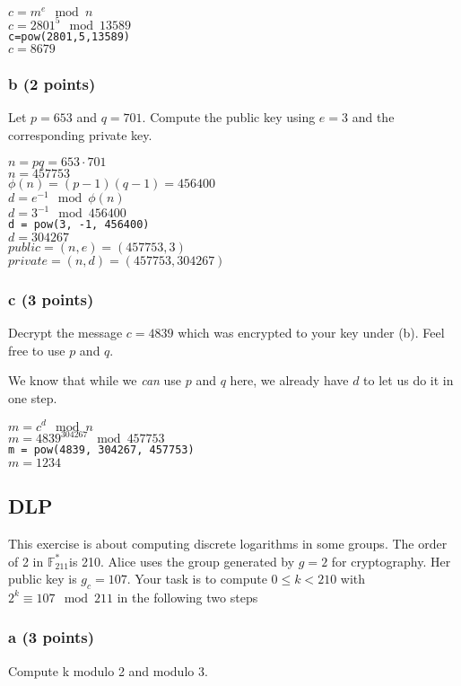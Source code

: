 \documentclass{article}
\begin{document}
$c=m^e \mod n$ \\
$c=2801^5 \mod 13589$ \\
\verb|c=pow(2801,5,13589)| \\
$c=8679$

\subsubsection{b (2 points)}
Let $p = 653$ and $q = 701$. Compute the public key
using $e = 3$ and the corresponding private key.

$n = pq = 653 \cdot 701$ \\
$n = 457753$ \\
$\phi(n) = (p-1)(q-1) = 456400$ \\
$d = e^{-1} \mod \phi(n)$ \\
$d = 3^{-1} \mod 456400$ \\
\verb|d = pow(3, -1, 456400)| \\
$d = 304267$ \\

$public = (n,e) = (457753, 3)$ \\
$private = (n,d)= (457753, 304267)$ \\


\subsubsection{c (3 points)}
Decrypt the message $c = 4839$ which was encrypted to your key under (b). Feel
free to use $p$ and $q$.

We know that while we \textit{can} use $p$ and $q$ here, we already have $d$ to let
us do it in one step.

$m=c^d \mod n$ \\
$m=4839^{304267} \mod 457753$ \\
\verb|m = pow(4839, 304267, 457753)| \\
$m = 1234$

\subsection{DLP}
This exercise is about computing discrete logarithms in some groups.
The order of 2 in $\mathbb{F}_{211}^{*}$is 210. Alice uses the group generated
by $g = 2$ for cryptography. Her public key is $g_c = 107$.
Your task is to compute $0 \leq k < 210$ with $2^k \equiv 107 \mod 211$ in the following two steps

\subsubsection{a (3 points)}
Compute k modulo 2 and modulo 3.
\end{document}
